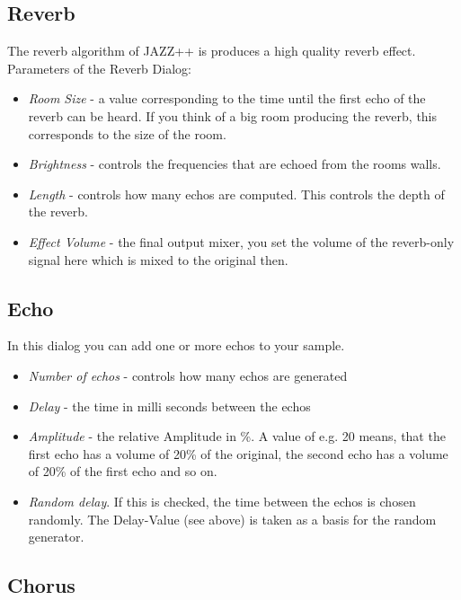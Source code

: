 \documentclass[letterpaper]{report}
\begin{document}
\subsection{Reverb}

The reverb algorithm of JAZZ++ is produces a high quality reverb effect.
Parameters of the Reverb Dialog:

\begin{itemize}
\item {\em Room Size} - a value corresponding to the time until the first
echo of the reverb can be heard. If you think of a big room producing
the reverb, this corresponds to the size of the room.
\item {\em Brightness} - controls the frequencies that are echoed from
the rooms walls.
\item {\em Length} - controls how many echos are computed. This controls the
depth of the reverb.
\item {\em Effect Volume} - the final output mixer, you set the volume of the
reverb-only signal here which is mixed to the original then.
\end{itemize}



\subsection{Echo}

In this dialog you can add one or more echos to your sample.
\begin{itemize}
\item {\em Number of echos} - controls how many echos are generated
\item {\em Delay} - the time in milli seconds between the echos
\item {\em Amplitude} - the relative Amplitude in \%. A value of e.g. 20 means,
that the first echo has a volume of 20\% of the original, the second
echo has a volume of 20\% of the first echo and so on.
\item {\em Random delay}. If this is checked, the time between the echos is
chosen randomly. The Delay-Value (see above) is taken as a basis
for the random generator.
\end{itemize}




\subsection{Chorus}
\end{document}
